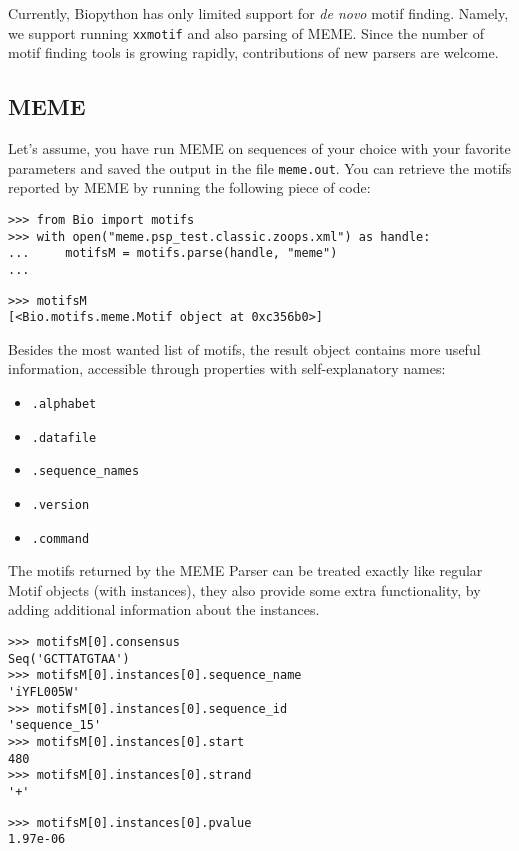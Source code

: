 Currently, Biopython has only limited support for \emph{de novo} motif
finding. Namely, we support running \verb|xxmotif| and also parsing of
MEME. Since the number of motif finding tools is growing rapidly,
contributions of new parsers are welcome.

\subsection{MEME}
\label{sec:meme}

Let's assume, you have run MEME on sequences of your choice with your
favorite parameters and saved the output in the file
\verb|meme.out|. You can retrieve the motifs reported by MEME by
running the following piece of code:

\begin{verbatim}
>>> from Bio import motifs
>>> with open("meme.psp_test.classic.zoops.xml") as handle:
...     motifsM = motifs.parse(handle, "meme")
...
\end{verbatim}
\begin{verbatim}
>>> motifsM
[<Bio.motifs.meme.Motif object at 0xc356b0>]
\end{verbatim}

Besides the most wanted list of motifs, the result object contains more useful information, accessible through properties with self-explanatory names:
\begin{itemize}
\item \verb|.alphabet|
\item \verb|.datafile|
\item \verb|.sequence_names|
\item \verb|.version|
\item \verb|.command|
\end{itemize}

The motifs returned by the MEME Parser can be treated exactly like regular
Motif objects (with instances), they also provide some extra
functionality, by adding additional information about the instances.

\begin{verbatim}
>>> motifsM[0].consensus
Seq('GCTTATGTAA')
>>> motifsM[0].instances[0].sequence_name
'iYFL005W'
>>> motifsM[0].instances[0].sequence_id
'sequence_15'
>>> motifsM[0].instances[0].start
480
>>> motifsM[0].instances[0].strand
'+'
\end{verbatim}
\begin{verbatim}
>>> motifsM[0].instances[0].pvalue
1.97e-06
\end{verbatim}


